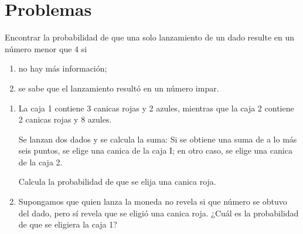 \section*{Problemas}

\begin{problema}
	\label{bayes-pro-1}
	\label{exmp:1.13}
	Encontrar la probabilidad de que una solo lanzamiento de un dado resulte en un número menor que $4$ si
	\begin{enumerate}
		\item no hay más información; 
		\item se sabe que el lanzamiento resultó en un número impar.
	\end{enumerate}
	
\end{problema}


\begin{problema}
	\begin{enumerate}
		\item 
		La caja 1 contiene 3 canicas rojas y 2 azules, mientras que la caja 2 contiene 2 canicas rojas y 8 azules. 
		
		Se lanzan dos dados y se calcula la suma:  
		Si se obtiene una suma de a lo más seis puntos, se elige una canica de la caja I; en otro caso, se elige una canica de la caja 2. 
		
		Calcula la probabilidad de que se elija una canica roja.
		\item Supongamos que quien lanza la moneda no revela si que número se obtuvo del dado, pero sí revela que se eligió una canica roja. ¿Cuál es la probabilidad de que se eligiera la caja 1?
	\end{enumerate}
\end{problema}

